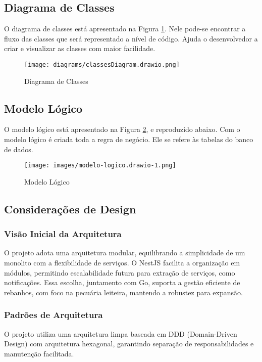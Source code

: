 \documentclass[12pt, a4paper]{article}
\begin{document}
\subsection{Diagrama de Classes}
\begin{spacing}{1.5}
O diagrama de classes está apresentado na Figura \ref{fig:classes-diagram}. Nele pode-se encontrar a fluxo das classes que será representado a nível de código. Ajuda o desenvolvedor a criar e visualizar as classes com maior facilidade.
\begin{figure}[H]
    \centering
    \texttt{[image: diagrams/classesDiagram.drawio.png]}
    \caption{Diagrama de Classes}
    \label{fig:classes-diagram}
\end{figure}
\end{spacing}

\subsection{Modelo Lógico}
\begin{spacing}{1.5}
O modelo lógico está apresentado na Figura \ref{fig:entity-relationship}, e reproduzido abaixo. Com o modelo lógico é criada toda a regra de negócio. Ele se refere às tabelas do banco de dados.
\begin{figure}[H]
\centering
\texttt{[image: images/modelo-logico.drawio-1.png]}
\caption{Modelo Lógico}
\label{fig:entity-relationship}
\end{figure}
\end{spacing}

\subsection{Considerações de Design}
\subsubsection{Visão Inicial da Arquitetura}
\begin{spacing}{1.5}
O projeto adota uma arquitetura modular, equilibrando a simplicidade de um monolito com a flexibilidade de serviços. O NestJS facilita a organização em módulos, permitindo escalabilidade futura para extração de serviços, como notificações. Essa escolha, juntamento com Go, suporta a gestão eficiente de rebanhos, com foco na pecuária leiteira, mantendo a robustez para expansão.
\end{spacing}

\subsubsection{Padrões de Arquitetura}
\begin{spacing}{1.5}
O projeto utiliza uma arquitetura limpa baseada em DDD (Domain-Driven Design) com arquitetura hexagonal, garantindo separação de responsabilidades e manutenção facilitada.
\end{spacing}
\end{document}
